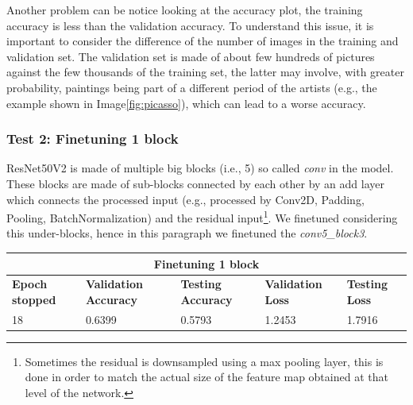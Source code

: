 Another problem can be notice looking at the accuracy plot, the training accuracy is less than the validation accuracy. To understand this issue, it is important to consider the difference of the number of images in the training and validation set. The validation set is made of about few hundreds of pictures against the few thousands of the training set, the latter may involve, with greater probability, paintings being part of a different period of the artists (e.g., the example shown in Image\ref{fig:picasso}), which can lead to a worse accuracy.


\subsubsection{Test 2: Finetuning 1 block}
ResNet50V2 is made of multiple big blocks (i.e., 5) so called \textit{conv} in the model. These blocks are made of sub-blocks connected by each other by an add layer which connects the processed input (e.g., processed by Conv2D, Padding, Pooling, BatchNormalization) and the residual input\footnote{Sometimes the residual is downsampled using a max pooling layer, this is done in order to match the actual size of the feature map obtained at that level of the network.}. We finetuned considering this under-blocks, hence in this paragraph we finetuned the \textit{conv5\_block3}.

\medskip

\begin{tabular}{ |p{2cm}|p{2cm}|p{2cm}|p{2cm}|p{2cm}|  }
\hline
\multicolumn{5}{|c|}{Finetuning 1 block} \\
\hline
\textbf{Epoch stopped} & \textbf{Validation Accuracy} & \textbf{Testing Accuracy} & \textbf{Validation Loss} & \textbf{Testing Loss} \\
\hline
18 & 0.6399 & 0.5793 & 1.2453 & 1.7916\\
\hline
\end{tabular}

